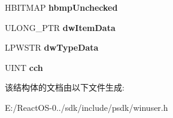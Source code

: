 \begin{DoxyCompactItemize}
H\+B\+I\+T\+M\+AP {\bfseries hbmp\+Unchecked}
\item 
\mbox{\label{structtag_m_e_n_u_i_t_e_m_i_n_f_o_w_a164b0a1ec033cdc450d7190b33cc4486}} 
U\+L\+O\+N\+G\+\_\+\+P\+TR {\bfseries dw\+Item\+Data}
\item 
\mbox{\label{structtag_m_e_n_u_i_t_e_m_i_n_f_o_w_a5935b547e7a232b8397e4b4487a03569}} 
L\+P\+W\+S\+TR {\bfseries dw\+Type\+Data}
\item 
\mbox{\label{structtag_m_e_n_u_i_t_e_m_i_n_f_o_w_a685e8856ce91c6a51137ad52f9b6970f}} 
U\+I\+NT {\bfseries cch}
\end{DoxyCompactItemize}


该结构体的文档由以下文件生成\+:\begin{DoxyCompactItemize}
\item 
E\+:/\+React\+O\+S-\/0../sdk/include/psdk/winuser.\+h\end{DoxyCompactItemize}
